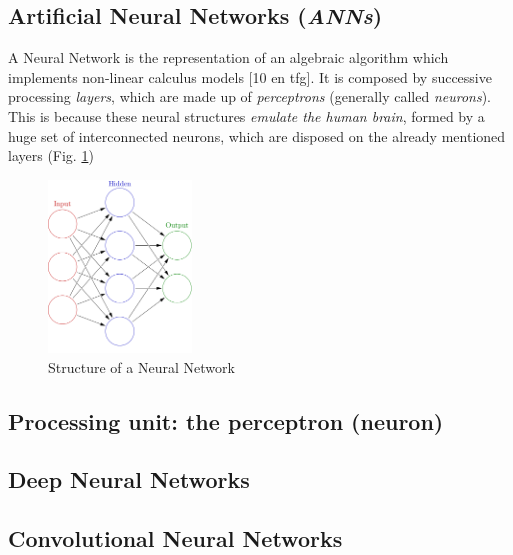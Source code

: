 \subsection{Artificial Neural Networks (\emph{ANNs})}


A Neural Network is the representation of an algebraic algorithm which implements non-linear calculus models [10 en tfg]. It is composed by successive processing \emph{layers}, which are made up of \emph{perceptrons} (generally called \emph{neurons}). This is because these neural structures \emph{emulate the human brain}, formed by a huge set of interconnected neurons, which are disposed on the already mentioned layers (Fig. \ref{fig:intro_neural_network})


\begin{figure}[h]
	\centering
	\includegraphics[width=1.5in]{images/neural_network}
	\caption{Structure of a Neural Network}
	\label{fig:intro_neural_network}
\end{figure}


\subsection{Processing unit: the perceptron (neuron)}


\subsection{Deep Neural Networks}


\subsection{Convolutional Neural Networks}



















